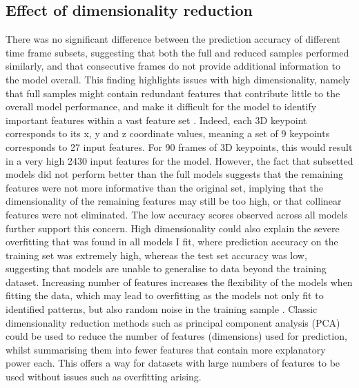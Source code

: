 \documentclass[11pt, letterpaper]{article} %
\begin{document}
\subsection{Effect of dimensionality reduction}
There was no significant difference between the prediction accuracy of different time frame subsets, suggesting that both the full and reduced samples performed similarly, and that consecutive frames do not provide additional information to the model overall. This finding highlights issues with high dimensionality, namely that full samples might contain redundant features that contribute little to the overall model performance, and make it difficult for the model to identify important features within a vast feature set \citep{curse_2005}. Indeed, each 3D keypoint corresponds to its x, y and z coordinate values, meaning a set of 9 keypoints corresponds to 27 input features. For 90 frames of 3D keypoints, this would result in a very high 2430 input features for the model.
%
However, the fact that subsetted models did not perform better than the full models suggests that the remaining features were not more informative than the original set, implying that the dimensionality of the remaining features may still be too high, or that collinear features were not eliminated. The low accuracy scores observed across all models further support this concern.
%
High dimensionality could also explain the severe overfitting that was found in all models I fit, where prediction accuracy on the training set was extremely high, whereas the test set accuracy was low, suggesting that models are unable to generalise to data beyond the training dataset. Increasing number of features increases the flexibility of the models when fitting the data, which may lead to overfitting as the models not only fit to identified patterns, but also random noise in the training sample \citep{curses_2018}. 
%
Classic dimensionality reduction methods such as principal component analysis (PCA) could be used to reduce the number of features (dimensions) used for prediction, whilst summarising them into fewer features that contain more explanatory power each. This offers a way for datasets with large numbers of features to be used without issues such as overfitting arising.



\end{document}
